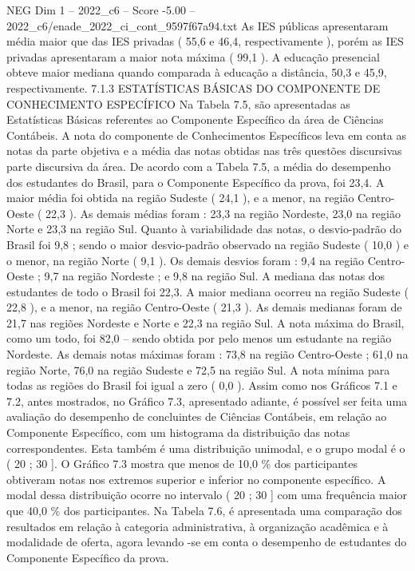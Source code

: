 \begin{textsample}{NEG Dim 1 – 2022\_c6 – Score -5.00 – 2022\_c6/enade\_2022\_ci\_cont\_9597f67a94.txt}
As IES públicas apresentaram média maior que das IES privadas ( 55,6 e 46,4, respectivamente ), porém as IES privadas apresentaram a maior nota máxima ( 99,1 ).
A educação presencial obteve maior mediana quando comparada à educação a distância, 50,3 e 45,9, respectivamente. 7.1.3 ESTATÍSTICAS BÁSICAS DO COMPONENTE DE CONHECIMENTO ESPECÍFICO Na Tabela 7.5, são apresentadas as Estatísticas Básicas referentes ao Componente Específico da área de Ciências Contábeis.
A nota do componente de Conhecimentos Específicos leva em conta as notas da parte objetiva e a média das notas obtidas nas três questões discursivas parte discursiva da área.
De acordo com a Tabela 7.5, a média do desempenho dos estudantes do Brasil, para o Componente Específico da prova, foi 23,4.
A maior média foi obtida na região Sudeste ( 24,1 ), e a menor, na região Centro-Oeste ( 22,3 ).
As demais médias foram : 23,3 na região Nordeste, 23,0 na região Norte e 23,3 na região Sul.
Quanto à variabilidade das notas, o desvio-padrão do Brasil foi 9,8 ; sendo o maior desvio-padrão observado na região Sudeste ( 10,0 ) e o menor, na região Norte ( 9,1 ).
Os demais desvios foram : 9,4 na região Centro-Oeste ; 9,7 na região Nordeste ; e 9,8 na região Sul.
A mediana das notas dos estudantes de todo o Brasil foi 22,3.
A maior mediana ocorreu na região Sudeste ( 22,8 ), e a menor, na região Centro-Oeste ( 21,3 ).
As demais medianas foram de 21,7 nas regiões Nordeste e Norte e 22,3 na região Sul.
A nota máxima do Brasil, como um todo, foi 82,0 – sendo obtida por pelo menos um estudante na região Nordeste.
As demais notas máximas foram : 73,8 na região Centro-Oeste ; 61,0 na região Norte, 76,0 na região Sudeste e 72,5 na região Sul.
A nota mínima para todas as regiões do Brasil foi igual a zero ( 0,0 ).
Assim como nos Gráficos 7.1 e 7.2, antes mostrados, no Gráfico 7.3, apresentado adiante, é possível ser feita uma avaliação do desempenho de concluintes de Ciências Contábeis, em relação ao Componente Específico, com um histograma da distribuição das notas correspondentes.
Esta também é uma distribuição unimodal, e o grupo modal é o ( 20 ; 30 ].
O Gráfico 7.3 mostra que menos de 10,0 \% dos participantes obtiveram notas nos extremos superior e inferior no componente específico.
A modal dessa distribuição ocorre no intervalo ( 20 ; 30 ] com uma frequência maior que 40,0 \% dos participantes.
Na Tabela 7.6, é apresentada uma comparação dos resultados em relação à categoria administrativa, à organização acadêmica e à modalidade de oferta, agora levando -se em conta o desempenho de estudantes do Componente Específico da prova.

\end{textsample}
